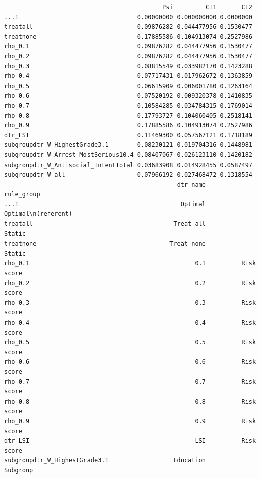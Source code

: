 \documentclass[11pt]{article}\usepackage[]{graphicx}\usepackage[]{xcolor}
\makeatletter
\newenvironment{kframe}{%
 \def\at@end@of@kframe{}%
 \ifinner\ifhmode%
  \def\at@end@of@kframe{\end{minipage}}%
  \begin{minipage}{\columnwidth}%
 \fi\fi%
 \def\FrameCommand##1{\hskip\@totalleftmargin \hskip-\fboxsep
 \colorbox{shadecolor}{##1}\hskip-\fboxsep
     \hskip-\linewidth \hskip-\@totalleftmargin \hskip\columnwidth}%
 \MakeFramed {\advance\hsize-\width
   \@totalleftmargin\z@ \linewidth\hsize
   \@setminipage}}%
 {\par\unskip\endMakeFramed%
 \at@end@of@kframe}
\newenvironment{knitrout}{}{} %
\makeatother
\begin{document}
\begin{knitrout}
\color{fgcolor}\begin{kframe}
\begin{verbatim}
                                            Psi         CI1       CI2
...1                                 0.00000000 0.000000000 0.0000000
treatall                             0.09876282 0.044477956 0.1530477
treatnone                            0.17885586 0.104913074 0.2527986
rho_0.1                              0.09876282 0.044477956 0.1530477
rho_0.2                              0.09876282 0.044477956 0.1530477
rho_0.3                              0.08815549 0.033982170 0.1423288
rho_0.4                              0.07717431 0.017962672 0.1363859
rho_0.5                              0.06615909 0.006001780 0.1263164
rho_0.6                              0.07520192 0.009320378 0.1410835
rho_0.7                              0.10584285 0.034784315 0.1769014
rho_0.8                              0.17793727 0.104060405 0.2518141
rho_0.9                              0.17885586 0.104913074 0.2527986
dtr_LSI                              0.11469300 0.057567121 0.1718189
subgroupdtr_W_HighestGrade3.1        0.08230121 0.019704316 0.1448981
subgroupdtr_W_Arrest_MostSerious10.4 0.08407067 0.026123110 0.1420182
subgroupdtr_W_Antisocial_IntentTotal 0.03683908 0.014928455 0.0587497
subgroupdtr_W_all                    0.07966192 0.027468472 0.1318554
                                                dtr_name          rule_group
...1                                             Optimal Optimal\n(referent)
treatall                                       Treat all              Static
treatnone                                     Treat none              Static
rho_0.1                                              0.1          Risk score
rho_0.2                                              0.2          Risk score
rho_0.3                                              0.3          Risk score
rho_0.4                                              0.4          Risk score
rho_0.5                                              0.5          Risk score
rho_0.6                                              0.6          Risk score
rho_0.7                                              0.7          Risk score
rho_0.8                                              0.8          Risk score
rho_0.9                                              0.9          Risk score
dtr_LSI                                              LSI          Risk score
subgroupdtr_W_HighestGrade3.1                  Education            Subgroup

\end{verbatim}
\end{kframe}
\end{knitrout}
\end{document}

